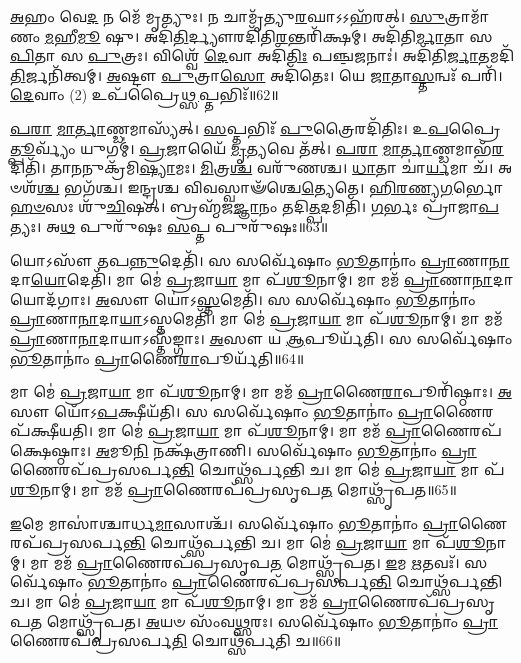 \-\ul{𑌅}\-𑌹𑌂 𑌵𑍇\-\ul{𑌦} 𑌨 𑌮𑍇᳴ 𑌮𑍃𑌤𑍍𑌯𑍁𑌃। 𑌨 𑌚𑌾𑌮𑍃᳴𑌤𑍍𑌯𑍁\-\ul{𑌰}\-𑌘𑌾𑌽𑌽𑌹᳴𑌰𑌤𑍍। 
\-\ul{𑌸𑍁}\-𑌤𑍍𑌰𑌾𑌮𑌾᳴𑌣𑌂 \ul{𑌮}\-𑌹𑍀\-\ul{𑌮𑍂} 𑌷𑍁। 𑌅𑌦𑌿᳴\-\ul{𑌤𑌿}\-𑌰𑍍𑌦𑍍𑌯𑍗𑌰𑌦𑌿᳴𑌤𑌿\-\ul{𑌰}\-𑌨𑍍𑌤𑌰𑌿᳴𑌕𑍍𑌷𑌮𑍍। 
𑌅𑌦𑌿᳴𑌤𑌿\-\ul{𑌰𑍍𑌮𑌾}\-𑌤𑌾 𑌸 \ul{𑌪𑌿}\-𑌤𑌾 𑌸 \ul{𑌪𑍁}\-𑌤𑍍𑌰𑌃। 𑌵𑌿𑌶𑍍𑌵𑍇᳴ \ul{𑌦𑍇}\-𑌵𑌾 𑌅𑌦𑌿᳴\-\ul{𑌤𑌿𑌃} 𑌪𑌞𑍍𑌚\-॒𑌜𑌨𑌾𑌃॑। 
𑌅𑌦𑌿᳴𑌤𑌿\-\ul{𑌰𑍍𑌜𑌾}\-𑌤𑌮𑌦𑌿᳴\-\ul{𑌤𑌿}\-𑌰𑍍𑌜𑌨𑌿᳴𑌤𑍍𑌵𑌮𑍍। \ul{𑌅}\-𑌷𑍍𑌟𑍗 \ul{𑌪𑍁}\-𑌤𑍍𑌰𑌾\-\ul{𑌸𑍋} 𑌅𑌦𑌿᳴𑌤𑍇𑌃। 
𑌯𑍇 \ul{𑌜𑌾}\-𑌤𑌾\-\ul{𑌸𑍍𑌤}\-𑌨𑍍𑌵𑌃᳴ 𑌪𑌰𑌿᳴। \ul{𑌦𑍇}\-𑌵𑌾𑌂 (2) 𑌉𑌪᳴𑌪𑍍𑌰𑍈\-\ul{𑌥𑍍𑌸}\-𑌪𑍍𑌤𑌭𑌿𑌃᳴॥62॥


\-\ul{𑌪}\-\-\ul{𑌰𑌾} \ul{𑌮𑌾}\-\-\ul{𑌰𑍍𑌤𑌾}\-𑌣𑍍𑌡𑌮𑌾𑌸𑍍𑌯᳴𑌤𑍍। \ul{𑌸}\-𑌪𑍍𑌤𑌭𑌿𑌃᳴ \ul{𑌪𑍁}\-𑌤𑍍𑌰𑍈𑌰𑌦𑌿᳴𑌤𑌿𑌃। 
𑌉\-\ul{𑌪}\-𑌪𑍍𑌰𑍈\-\ul{𑌤𑍍𑌪𑍂}\-𑌰𑍍𑌵𑍍𑌯𑌂᳴ 𑌯𑍁𑌗𑌮𑍍॑। \ul{𑌪𑍍𑌰}\-𑌜𑌾𑌯𑍈᳴ \ul{𑌮𑍃}\-𑌤𑍍𑌯𑌵𑍇 𑌤᳴𑌤𑍍। 
\-\ul{𑌪}\-\-\ul{𑌰𑌾} \ul{𑌮𑌾}\-\-\ul{𑌰𑍍𑌤𑌾}\-𑌣𑍍𑌡𑌮𑌾𑌭᳴\-\ul{𑌰}\-𑌦𑌿𑌤𑌿᳴। 𑌤𑌾𑌨𑌨𑍁𑌕𑍍𑌰᳴𑌮𑌿\-\ul{𑌷𑍍𑌯𑌾}\-𑌮𑌃। 
\-\ul{𑌮𑌿}\-𑌤𑍍𑌰\-\ul{𑌶𑍍𑌚} 𑌵𑌰𑍁᳴𑌣𑌶𑍍𑌚। \ul{𑌧𑌾}\-𑌤𑌾 𑌚𑌾॑\-\ul{𑌰𑍍𑌯}\-𑌮𑌾 𑌚᳴। 
𑌅𑍞𑌶᳴\-\ul{𑌶𑍍𑌚} 𑌭𑌗᳴𑌶𑍍𑌚। 𑌇𑌨𑍍𑌦𑍍𑌰𑌶𑍍𑌚 𑌵𑌿𑌵𑌸𑍍𑌵𑌾𑍟᳴𑌶𑍍𑌚𑍇\-\ul{𑌤𑍍𑌯𑍇}\-𑌤𑍇। 
\-\ul{𑌹𑌿}\-\-\ul{𑌰}\-\-\ul{𑌣𑍍𑌯}\-\-\ul{𑌗}\-𑌰𑍍𑌭𑍋 \ul{𑌹}\-\-\ul{𑍞}\-𑌸𑌃 𑌶𑍁᳴\-\ul{𑌚𑌿}\-𑌷𑌤𑍍। 
𑌬𑍍𑌰𑌹𑍍𑌮᳴𑌜\-\ul{𑌜𑍍𑌞𑌾}\-𑌨𑌂 𑌤𑌦𑌿\-\ul{𑌤𑍍𑌪}\-𑌦𑌮𑌿𑌤𑌿᳴। \ul{𑌗}\-𑌰𑍍𑌭𑌃 𑌪𑍍𑌰𑌾᳴𑌜𑌾\-\ul{𑌪}\-𑌤𑍍𑌯𑌃। 
𑌅\-\ul{𑌥} 𑌪𑍁𑌰𑍁᳴𑌷𑌃 \ul{𑌸}\-𑌪𑍍𑌤 𑌪𑍁𑌰𑍁᳴𑌷𑌃॥63॥

\noindent[\-\ul{𑌯}\-\-\ul{𑌥𑌾}\-\-\ul{𑌸𑍍𑌥𑌾}\-𑌨𑌂 𑌗᳴\-\ul{𑌰𑍍𑌭𑌿}\-𑌣𑍍𑌯𑌃᳴]\anuvakamend

𑌯𑍋𑌽𑌸𑍗᳴ \ul{𑌤}\-𑌪\-\ul{𑌨𑍍𑌨𑍁}\-𑌦𑍇𑌤𑌿᳴। 𑌸 𑌸𑌰𑍍𑌵𑍇᳴𑌷𑌾𑌂 \ul{𑌭𑍂}\-𑌤𑌾𑌨𑌾𑌂॑ \ul{𑌪𑍍𑌰𑌾}\-𑌣𑌾\-\ul{𑌨𑌾}\-𑌦𑌾\-\ul{𑌯𑍋}\-𑌦𑍇𑌤𑌿᳴। 
𑌮𑌾 𑌮𑍇॑ \ul{𑌪𑍍𑌰}\-𑌜𑌾\-\ul{𑌯𑌾} 𑌮𑌾 𑌪᳴\-\ul{𑌶𑍂}\-𑌨𑌾𑌮𑍍। 𑌮𑌾 𑌮𑌮᳴ \ul{𑌪𑍍𑌰𑌾}\-𑌣𑌾\-\ul{𑌨𑌾}\-𑌦𑌾𑌯𑍋𑌦᳴𑌗𑌾𑌃। 
\-\ul{𑌅}\-𑌸𑍗 𑌯𑍋॑𑌽\-\ul{𑌸𑍍𑌤}\-𑌮𑍇𑌤𑌿᳴। 𑌸 𑌸𑌰𑍍𑌵𑍇᳴𑌷𑌾𑌂 \ul{𑌭𑍂}\-𑌤𑌾𑌨𑌾𑌂॑ \ul{𑌪𑍍𑌰𑌾}\-𑌣𑌾\-\ul{𑌨𑌾}\-𑌦𑌾\-\ul{𑌯𑌾}\-𑌽𑌸𑍍𑌤𑌮𑍇𑌤𑌿᳴। 
𑌮𑌾 𑌮𑍇॑ \ul{𑌪𑍍𑌰}\-𑌜𑌾\-\ul{𑌯𑌾} 𑌮𑌾 𑌪᳴\-\ul{𑌶𑍂}\-𑌨𑌾𑌮𑍍। 𑌮𑌾 𑌮𑌮᳴ \ul{𑌪𑍍𑌰𑌾}\-𑌣𑌾\-\ul{𑌨𑌾}\-𑌦𑌾𑌯𑌾𑌽𑌸𑍍𑌤᳴𑌙𑍍𑌗𑌾𑌃। 
\-\ul{𑌅}\-𑌸𑍗 𑌯 \ul{𑌆}\-𑌪𑍂𑌰𑍍𑌯᳴𑌤𑌿। 𑌸 𑌸𑌰𑍍𑌵𑍇᳴𑌷𑌾𑌂 \ul{𑌭𑍂}\-𑌤𑌾𑌨𑌾𑌂॑ \ul{𑌪𑍍𑌰𑌾}\-𑌣𑍈\-\ul{𑌰𑌾}\-𑌪𑍂𑌰𑍍𑌯᳴𑌤𑌿॥64॥


𑌮𑌾 𑌮𑍇॑ \ul{𑌪𑍍𑌰}\-𑌜𑌾\-\ul{𑌯𑌾} 𑌮𑌾 𑌪᳴\-\ul{𑌶𑍂}\-𑌨𑌾𑌮𑍍। 𑌮𑌾 𑌮𑌮᳴ \ul{𑌪𑍍𑌰𑌾}\-𑌣𑍈\-\ul{𑌰𑌾}\-𑌪𑍂𑌰𑌿᳴𑌷𑍍𑌠𑌾𑌃। 
\-\ul{𑌅}\-𑌸𑍗 𑌯𑍋᳴𑌽\-\ul{𑌪}\-𑌕𑍍𑌷𑍀𑌯᳴𑌤𑌿। 𑌸 𑌸𑌰𑍍𑌵𑍇᳴𑌷𑌾𑌂 \ul{𑌭𑍂}\-𑌤𑌾𑌨𑌾𑌂॑ \ul{𑌪𑍍𑌰𑌾}\-𑌣𑍈𑌰𑌪᳴𑌕𑍍𑌷𑍀𑌯𑌤𑌿। 
𑌮𑌾 𑌮𑍇॑ \ul{𑌪𑍍𑌰}\-𑌜𑌾\-\ul{𑌯𑌾} 𑌮𑌾 𑌪᳴\-\ul{𑌶𑍂}\-𑌨𑌾𑌮𑍍। 𑌮𑌾 𑌮𑌮᳴ \ul{𑌪𑍍𑌰𑌾}\-𑌣𑍈𑌰𑌪᳴𑌕𑍍𑌷𑍇𑌷𑍍𑌠𑌾𑌃। 
\-\ul{𑌅}\-𑌮𑍂\-\ul{𑌨𑌿} 𑌨𑌕𑍍𑌷᳴𑌤𑍍𑌰𑌾𑌣𑌿। 𑌸𑌰𑍍𑌵𑍇᳴𑌷𑌾𑌂 \ul{𑌭𑍂}\-𑌤𑌾𑌨𑌾𑌂॑ \ul{𑌪𑍍𑌰𑌾}\-𑌣𑍈𑌰𑌪᳴𑌪𑍍𑌰𑌸𑌰𑍍𑌪\-\ul{𑌨𑍍𑌤𑌿} 𑌚𑍋𑌥𑍍𑌸᳴𑌰𑍍𑌪𑌨𑍍𑌤𑌿 𑌚। 
𑌮𑌾 𑌮𑍇॑ \ul{𑌪𑍍𑌰}\-𑌜𑌾\-\ul{𑌯𑌾} 𑌮𑌾 𑌪᳴\-\ul{𑌶𑍂}\-𑌨𑌾𑌮𑍍। 𑌮𑌾 𑌮𑌮᳴ \ul{𑌪𑍍𑌰𑌾}\-𑌣𑍈𑌰𑌪᳴𑌪𑍍𑌰𑌸𑍃𑌪\-\ul{𑌤} 𑌮𑍋𑌥𑍍𑌸𑍃᳴𑌪𑌤॥65॥


\-\ul{𑌇}\-𑌮𑍇 𑌮𑌾𑌸𑌾॑𑌶𑍍𑌚𑌾𑌰𑍍𑌧\-\ul{𑌮𑌾}\-𑌸𑌾𑌶𑍍𑌚᳴। 𑌸𑌰𑍍𑌵𑍇᳴𑌷𑌾𑌂 \ul{𑌭𑍂}\-𑌤𑌾𑌨𑌾𑌂॑ \ul{𑌪𑍍𑌰𑌾}\-𑌣𑍈𑌰𑌪᳴𑌪𑍍𑌰𑌸𑌰𑍍𑌪\-\ul{𑌨𑍍𑌤𑌿} 𑌚𑍋𑌥𑍍𑌸᳴𑌰𑍍𑌪𑌨𑍍𑌤𑌿 𑌚। 
𑌮𑌾 𑌮𑍇॑ \ul{𑌪𑍍𑌰}\-𑌜𑌾\-\ul{𑌯𑌾} 𑌮𑌾 𑌪᳴\-\ul{𑌶𑍂}\-𑌨𑌾𑌮𑍍। 𑌮𑌾 𑌮𑌮᳴ \ul{𑌪𑍍𑌰𑌾}\-𑌣𑍈𑌰𑌪᳴𑌪𑍍𑌰𑌸𑍃𑌪\-\ul{𑌤} 𑌮𑍋𑌥𑍍𑌸𑍃᳴𑌪𑌤। 
\-\ul{𑌇}\-𑌮 \ul{𑌋}\-𑌤𑌵𑌃᳴। 𑌸𑌰𑍍𑌵𑍇᳴𑌷𑌾𑌂 \ul{𑌭𑍂}\-𑌤𑌾𑌨𑌾𑌂॑ \ul{𑌪𑍍𑌰𑌾}\-𑌣𑍈𑌰𑌪᳴𑌪𑍍𑌰𑌸𑌰𑍍𑌪\-\ul{𑌨𑍍𑌤𑌿} 𑌚𑍋𑌥𑍍𑌸᳴𑌰𑍍𑌪𑌨𑍍𑌤𑌿 𑌚। 
𑌮𑌾 𑌮𑍇॑ \ul{𑌪𑍍𑌰}\-𑌜𑌾\-\ul{𑌯𑌾} 𑌮𑌾 𑌪᳴\-\ul{𑌶𑍂}\-𑌨𑌾𑌮𑍍। 𑌮𑌾 𑌮𑌮᳴ \ul{𑌪𑍍𑌰𑌾}\-𑌣𑍈𑌰𑌪᳴𑌪𑍍𑌰𑌸𑍃𑌪\-\ul{𑌤} 𑌮𑍋𑌥𑍍𑌸𑍃᳴𑌪𑌤। 
\-\ul{𑌅}\-𑌯𑍞 𑌸𑌂᳴𑌵\-\ul{𑌥𑍍𑌸}\-𑌰𑌃। 𑌸𑌰𑍍𑌵𑍇᳴𑌷𑌾𑌂 \ul{𑌭𑍂}\-𑌤𑌾𑌨𑌾𑌂॑ \ul{𑌪𑍍𑌰𑌾}\-𑌣𑍈𑌰𑌪᳴𑌪𑍍𑌰𑌸𑌰𑍍𑌪\-\ul{𑌤𑌿} 𑌚𑍋𑌥𑍍𑌸᳴𑌰𑍍𑌪𑌤𑌿 𑌚॥66॥


